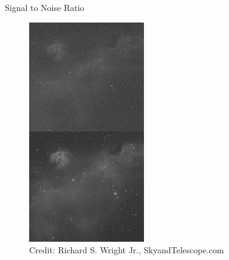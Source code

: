 \documentclass[11pt, aspectratio=169]{beamer}
\begin{document}
\begin{frame}{Signal to Noise Ratio}
\begin{figure}[!htb]
\begin{minipage}{0.2\textwidth}
	 	\includegraphics[width=0.9\linewidth]{figures/images/Uncool-189x360.jpg}
	 	\caption*{Credit: Richard S. Wright Jr., SkyandTelescope.com}
    \end{minipage}
\end{figure}
\end{frame}
\end{document}
